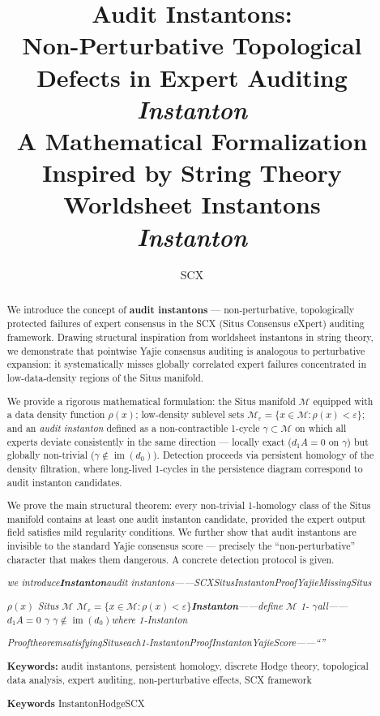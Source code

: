 \documentclass[11pt,a4paper]{article}
\title{
  {\large\textbf{Audit Instantons:}}\\[4pt]
  {\large\textbf{Non-Perturbative Topological Defects in Expert Auditing}}\\[8pt]
  {\normalsize\textit{Instanton}}\\[4pt]
  {\footnotesize A Mathematical Formalization Inspired by String Theory Worldsheet Instantons}\\[2pt]
  {\footnotesize\textit{Instanton}}
}
\author{SCX}
\date{}
\theoremstyle{plain}
\theoremstyle{definition}
\DeclareMathOperator{\im}{im}
\newcommand{\cM}{\mathcal{M}}
\begin{document}
\maketitle

\begin{abstract}
\noindent
We introduce the concept of \textbf{audit instantons} — non-perturbative, 
topologically protected failures of expert consensus in the SCX (Situs 
Consensus eXpert) auditing framework. Drawing structural inspiration from 
worldsheet instantons in string theory, we demonstrate that pointwise 
Yajie consensus auditing is analogous to perturbative expansion: it 
systematically misses globally correlated expert failures concentrated 
in low-data-density regions of the Situs manifold.

We provide a rigorous mathematical formulation: the Situs manifold 
$\cM$ equipped with a data density function $\rho(x)$; low-density 
sublevel sets $\cM_{\varepsilon} = \{x \in \cM : \rho(x) < \varepsilon\}$; 
and an \emph{audit instanton} defined as a non-contractible 1-cycle 
$\gamma \subset \cM$ on which all experts deviate consistently in the 
same direction — locally exact ($d_1 A = 0$ on $\gamma$) but globally 
non-trivial ($\gamma \notin \im(d_0)$). Detection proceeds via persistent 
homology of the density filtration, where long-lived 1-cycles in the 
persistence diagram correspond to audit instanton candidates. 

We prove the main structural theorem: every non-trivial 1-homology class 
of the Situs manifold contains at least one audit instanton candidate, 
provided the expert output field satisfies mild regularity conditions. 
We further show that audit instantons are invisible to the standard Yajie 
consensus score — precisely the ``non-perturbative'' character that makes 
them dangerous. A concrete detection protocol is given.

\bigskip
\noindent
\textit{we introduce\textbf{Instanton}audit instantons——SCXSitusInstantonProofYajieMissingSitus}

\textit{ $\rho(x)$  Situs  $\cM$ $\cM_{\varepsilon} = \{x \in \cM : \rho(x) < \varepsilon\}$\textbf{Instanton}——define $\cM$  1- $\gamma$all——$d_1 A = 0$  $\gamma$ $\gamma \notin \im(d_0)$where 1-Instanton}

\textit{ProoftheoremsatisfyingSituseach1-InstantonProofInstantonYajieScore——``''}

\bigskip
\noindent
\textbf{Keywords:} audit instantons, persistent homology, discrete Hodge theory, 
topological data analysis, expert auditing, non-perturbative effects, 
SCX framework

\noindent
\textbf{Keywords} InstantonHodgeSCX
\end{abstract}
\end{document}
